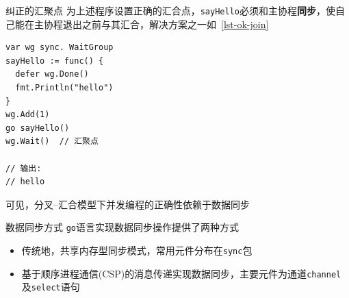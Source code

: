 \begin{frame}[fragile]{纠正的汇聚点}
为上述程序设置正确的汇合点，\texttt{sayHello}必须和主协程\textbf{同步}，使自己能在主协程退出之前与其汇合，解决方案之一如\lstlistingname~\ref{lst-ok-join}

\begin{lstlisting}[caption={利用同步确保\texttt{sayHello}在主协程退出之前与其汇合},label=lst-ok-join]
var wg sync. WaitGroup
sayHello := func() {
  defer wg.Done()
  fmt.Println("hello")
}
wg.Add(1)
go sayHello()
wg.Wait()  // 汇聚点

// 输出:
// hello    
\end{lstlisting}

\alert{可见，分叉--汇合模型下并发编程的正确性依赖于数据同步}
\end{frame}

\begin{frame}{数据同步方式}
\texttt{go}语言实现数据同步操作提供了两种方式
\begin{itemize}
    \item 传统地，\alert{共享内存型同步模式}，常用元件分布在\texttt{sync}包
    \item \alert{基于顺序进程通信(CSP)}的消息传递实现数据同步，主要元件为通道\texttt{channel}及\texttt{select}语句
\end{itemize}
\end{frame}